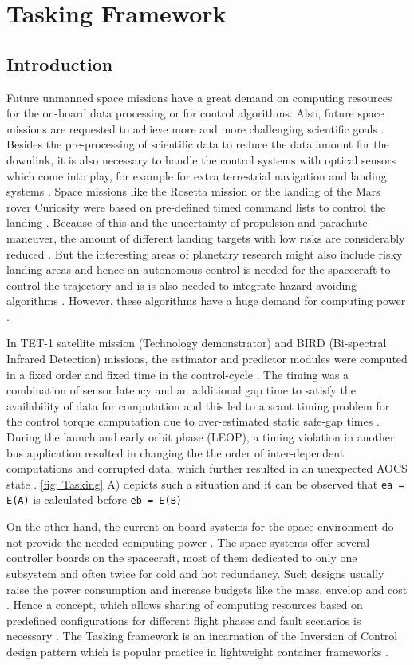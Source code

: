 
\chapter{Tasking Framework}
\section{Introduction}
Future unmanned space missions have a great demand on computing resources for the on-board data processing or for control algorithms. Also, future space missions are requested to achieve more and more challenging scientific goals \cite{PhdThesis}. Besides the pre-processing of scientific data to reduce the data amount for the downlink, it is also necessary to handle the control systems with optical sensors which come into play, for example for extra terrestrial navigation and landing systems \cite{ATON}. Space missions like the Rosetta mission or the landing of the Mars rover Curiosity were based on pre-defined timed command lists to control the landing \cite{TaskFr}. Because of this and the uncertainty of propulsion and parachute maneuver, the amount of different landing targets with low risks are considerably reduced \cite{TaskFr}. But the interesting areas of planetary research might also include risky landing areas and hence an autonomous control is needed for the spacecraft to control the trajectory and is is also needed to integrate hazard avoiding algorithms \cite{ATON}. However, these algorithms have a huge demand for computing power \cite{TaskFr}. 

In TET-1 satellite mission (Technology demonstrator) and BIRD (Bi-spectral Infrared Detection) missions, the estimator and predictor modules were computed in a fixed order and fixed time in the control-cycle \cite{TETBIRD}. The timing was a combination of sensor latency and an additional gap time to satisfy the availability of data for computation and this led to a scant timing problem for the control torque computation due to over-estimated static safe-gap times \cite{TETBIRD,TETtoEUCROPIS}. During the launch and early orbit phase (LEOP), a timing violation in another bus application resulted in changing the the order of inter-dependent computations and corrupted data, which further resulted in an unexpected AOCS state \cite{TETBIRD}. \cref{fig: Tasking} A) depicts such a situation and it can be observed that \texttt{ea = E(A)} is calculated before \texttt{eb = E(B)} 

On the other hand, the current on-board systems for the space environment do not provide the needed computing power \cite{TaskFr}. The space systems offer several controller boards on the spacecraft, most of them dedicated to only one subsystem and often twice for cold and hot redundancy. Such designs usually raise the power consumption and increase budgets like the mass, envelop and cost \cite{TaskFr}. Hence a concept, which allows sharing of computing resources based on predefined configurations for different flight phases and fault scenarios is necessary \cite{TaskFr}. The Tasking framework is an incarnation of the Inversion of Control design pattern which is popular practice in lightweight container frameworks \cite{InvOfCntrlurl}. 

